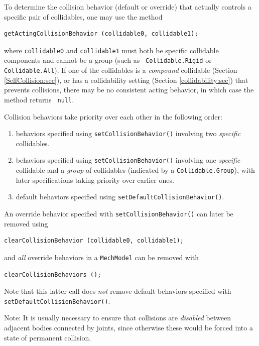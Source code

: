 To determine the collision behavior (default or override) that
actually controls a specific pair of collidables, one may
use the method
%
\begin{lstlisting}[]
  getActingCollisionBehavior (collidable0, collidable1);
\end{lstlisting}
%
where {\tt collidable0} and {\tt collidable1} must both be specific
collidable components and cannot be a group (such as {\tt
Collidable.Rigid} or {\tt Collidable.All}). If one of
the collidables is a {\it compound} collidable (Section
\ref{SelfCollision:sec}), or has a collidability setting (Section
\ref{collidability:sec}) that prevents collisions, there may be no
consistent acting behavior, in which case the method returns {\tt
null}.

Collision behaviors take priority over each other in the following
order:

\begin{enumerate}

\item behaviors specified using {\tt setCollisionBehavior()} involving
two {\it specific} collidables.

\item behaviors specified using {\tt setCollisionBehavior()} involving
one {\it specific} collidable and a {\it group} of collidables
(indicated by a {\tt Collidable.Group}), with later specifications
taking priority over earlier ones.

\item default behaviors specified using {\tt setDefaultCollisionBehavior()}.

\end{enumerate}

An override behavior specified with
{\tt setCollisionBehavior()} can later be removed
using 
%
\begin{lstlisting}[]
  clearCollisionBehavior (collidable0, collidable1);
\end{lstlisting}
%
and {\it all} override behaviors in a {\tt MechModel} can
be removed with
%
\begin{lstlisting}[]
  clearCollisionBehaviors ();
\end{lstlisting}
%
Note that this latter call does {\it not} remove default behaviors
specified with {\tt setDefaultCollisionBehavior()}.

\begin{sideblock}
Note: It is usually necessary to ensure that collisions are {\it disabled}
between adjacent bodies connected by joints, since otherwise these
would be forced into a state of permanent collision.
\end{sideblock}

